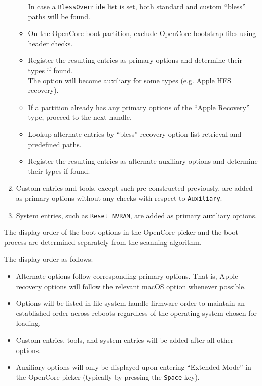 \documentclass[]{article}
\providecommand{\tightlist}{%
  \setlength{\itemsep}{0pt}\setlength{\parskip}{0pt}}
\begin{document}
\begin{enumerate}
\begin{itemize}
    In case a \texttt{BlessOverride} list is set, both standard and custom ``bless'' paths will be found.
  \item On the OpenCore boot partition, exclude OpenCore bootstrap files using header checks.
  \item Register the resulting entries as primary options and determine their types if found. \\
  The option will become auxiliary for some types (e.g. Apple HFS recovery).
  \item If a partition already has any primary options of the ``Apple Recovery'' type, proceed to the next handle.
  \item Lookup alternate entries by ``bless'' recovery option list retrieval and predefined paths.
  \item Register the resulting entries as alternate auxiliary options and determine their types if found.
  \end{itemize}
\item Custom entries and tools, except such pre-constructed previously, are added as primary options without any checks with respect to \texttt{Auxiliary}.
\item System entries, such as \texttt{Reset NVRAM}, are added as primary auxiliary options.
\end{enumerate}

The display order of the boot options in the OpenCore picker and the boot process
are determined separately from the scanning algorithm.

The display order as follows:

\begin{itemize}
\tightlist
\item Alternate options follow corresponding primary options. That is, Apple recovery options will follow the
  relevant macOS option whenever possible.
\item Options will be listed in file system handle firmware order to maintain an established order across
  reboots regardless of the operating system chosen for loading.
\item Custom entries, tools, and system entries will be added after all other options.
\item Auxiliary options will only be displayed upon entering ``Extended Mode'' in the OpenCore picker
(typically by pressing the \texttt{Space} key).
\end{itemize}
\end{document}
